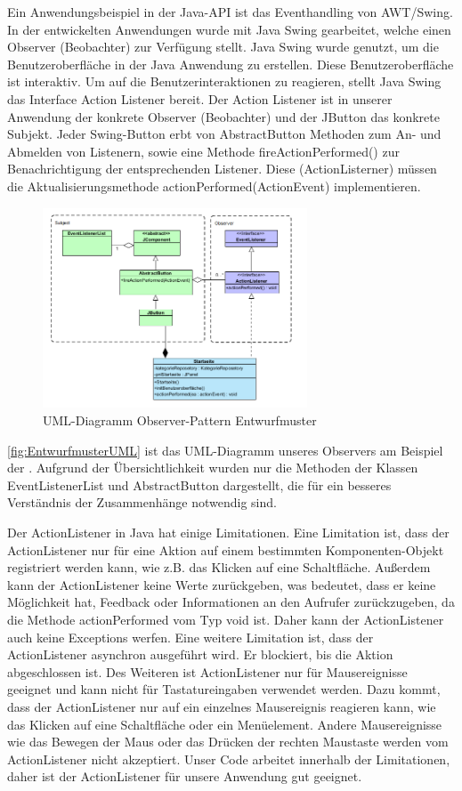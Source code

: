 Ein Anwendungsbeispiel in der Java-API ist das Eventhandling von AWT/Swing. In der entwickelten Anwendungen wurde mit Java Swing gearbeitet, welche einen Observer (Beobachter) zur Verfügung stellt. Java Swing wurde genutzt, um die Benutzeroberfläche in der Java Anwendung zu erstellen. Diese Benutzeroberfläche ist interaktiv. Um auf die Benutzerinteraktionen zu reagieren, stellt Java Swing das Interface Action Listener bereit. Der Action Listener ist in unserer Anwendung der konkrete Observer (Beobachter) und der JButton das konkrete Subjekt. Jeder Swing-Button erbt von AbstractButton Methoden zum An- und Abmelden von Listenern, sowie eine Methode fireActionPerformed() zur Benachrichtigung der entsprechenden Listener. Diese (ActionListerner) müssen die Aktualisierungsmethode actionPerformed(ActionEvent) implementieren.
\begin{figure}[ht]
	\centering
	\includegraphics[width=0.70\textwidth]{Bilder/Entwurfsmuster-UML.png} 
	\caption{UML-Diagramm Observer-Pattern Entwurfmuster}
	\label{fig:EntwurfmusterUML}
\end{figure}
\autoref{fig:EntwurfmusterUML} ist das UML-Diagramm unseres Observers am Beispiel der \href{https://github.com/MichaelaHaag/RezeptApp/blob/main/0-Plugins/src/main/java/de/rezeptapp/plugins/gui/Startseite.java}{}. 
Aufgrund der Übersichtlichkeit wurden nur die Methoden der Klassen EventListenerList und AbstractButton dargestellt, die für ein besseres Verständnis der Zusammenhänge notwendig sind. 

Der ActionListener in Java hat einige Limitationen. Eine Limitation ist, dass der ActionListener nur für eine Aktion auf einem bestimmten Komponenten-Objekt registriert werden kann, wie z.B. das Klicken auf eine Schaltfläche. Außerdem kann der ActionListener keine Werte zurückgeben, was bedeutet, dass er keine Möglichkeit hat, Feedback oder Informationen an den Aufrufer zurückzugeben, da die Methode actionPerformed vom Typ void ist. Daher kann der ActionListener auch keine Exceptions werfen.
Eine weitere Limitation ist, dass der ActionListener asynchron ausgeführt wird. Er blockiert, bis die Aktion abgeschlossen ist.
Des Weiteren ist ActionListener nur für Mausereignisse geeignet und kann nicht für Tastatureingaben verwendet werden. Dazu kommt, dass der ActionListener nur auf ein einzelnes Mausereignis reagieren kann, wie das Klicken auf eine Schaltfläche oder ein Menüelement. Andere Mausereignisse wie das Bewegen der Maus oder das Drücken der rechten Maustaste werden vom ActionListener nicht akzeptiert. Unser Code arbeitet innerhalb der Limitationen, daher ist der ActionListener für unsere Anwendung gut geeignet. 